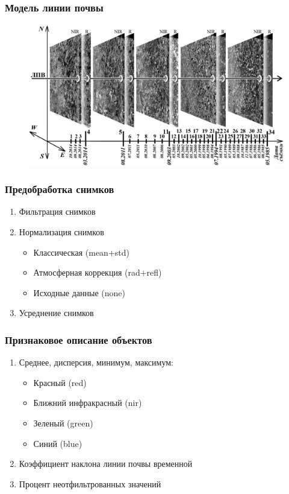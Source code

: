 \documentclass{beamer}
\begin{document}
\begin{frame}
\frametitle{Модель линии почвы}
\begin{figure}[H]
\centering
\includegraphics[width=0.7\linewidth]{imgs/soil_line_time.png}
\end{figure}
\end{frame}

\begin{frame}
\frametitle{Предобработка снимков}
\begin{enumerate}
    \item Фильтрация снимков
    \item Нормализация снимков
    \begin{itemize}
        \item Классическая (mean+std)
        \item Атмосферная коррекция (rad+refl)
        \item Исходные данные (none)
    \end{itemize}
    \item Усреднение снимков
\end{enumerate}
\end{frame}

\begin{frame}
\frametitle{Признаковое описание объектов}
\begin{enumerate}
\item Среднее, дисперсия, минимум, максимум:
    \begin{itemize}
        \item Красный (red)
        \item Ближний инфракрасный (nir)
        \item Зеленый (green)
        \item Синий (blue)
    \end{itemize}
\item Коэффициент наклона линии почвы временной
\item Процент неотфильтрованных значений
\end{enumerate}
\end{frame}
\end{document}
